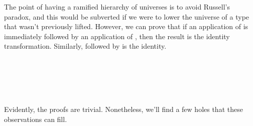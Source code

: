 The point of having a ramified hierarchy of universes is to avoid Russell's paradox, and this would be subverted if we were to lower the universe of a type that wasn't previously lifted.  However, we can prove that if an application of  is immediately followed by an application of , then the result is the identity transformation. Similarly,  followed by  is the identity.
\ccpad
\begin{code}%
\>[0]\AgdaSpace{}%
\AgdaSymbol{:}\AgdaSpace{}%
\AgdaSymbol{\{}\AgdaSpace{}%
\AgdaSpace{}%
\AgdaSymbol{:}\AgdaSpace{}%
\AgdaSymbol{\}\{}\AgdaSpace{}%
\AgdaSymbol{:}\AgdaSpace{}%
\AgdaSpace{}%
\AgdaSymbol{\}}\AgdaSpace{}%
\AgdaSpace{}%
\AgdaSymbol{\{}\AgdaSymbol{\}\{}\AgdaSymbol{\}}\AgdaSpace{}%
\AgdaSpace{}%
\AgdaSpace{}%
\AgdaSpace{}%
\AgdaSpace{}%
\<%
\\
\>[0]\AgdaSpace{}%
\AgdaSymbol{=}\AgdaSpace{}%
\<%
\\
%
\\[\AgdaEmptyExtraSkip]%
\>[0]\AgdaSpace{}%
\AgdaSymbol{:}\AgdaSpace{}%
\AgdaSymbol{\{}\AgdaSpace{}%
\AgdaSpace{}%
\AgdaSymbol{:}\AgdaSpace{}%
\AgdaSymbol{\}\{}\AgdaSpace{}%
\AgdaSymbol{:}\AgdaSpace{}%
\AgdaSpace{}%
\AgdaSymbol{\}}\AgdaSpace{}%
\AgdaSpace{}%
\AgdaSpace{}%
\AgdaSpace{}%
\AgdaSpace{}%
\AgdaSpace{}%
\AgdaSpace{}%
\AgdaSymbol{(}\AgdaSymbol{\{}\AgdaSymbol{\}\{}\AgdaSymbol{\}}\AgdaSpace{}%
\AgdaSymbol{)}\<%
\\
\>[0]\AgdaSpace{}%
\AgdaSymbol{=}\AgdaSpace{}%
\<%
\end{code}
\ccpad
Evidently, the proofs are trivial. Nonetheless, we'll find a few holes that these observations can fill.
